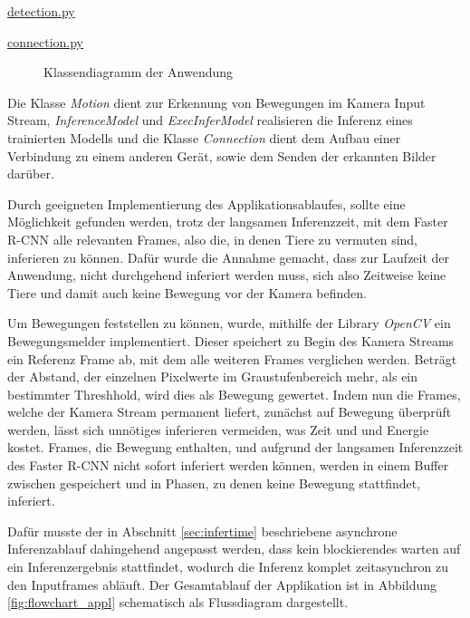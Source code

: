 \vspace{1cm}
\begin{minipage}{0.75\textwidth}
    \centering
    \underline{detection.py}
\end{minipage}
\begin{minipage}{0.25\textwidth}
    \centering
    \underline{connection.py}
\end{minipage}
\begin{figure}[H]
    \centering
        
    \caption{Klassendiagramm der Anwendung}
    \label{fig:class_diagram}
\end{figure}
\vspace{1cm}


Die Klasse \textit{Motion} dient zur Erkennung von Bewegungen 
im Kamera Input Stream, \textit{InferenceModel} und
\textit{ExecInferModel} realisieren die Inferenz 
eines trainierten Modells und die Klasse 
\textit{Connection} dient dem Aufbau einer
Verbindung zu einem anderen Gerät, sowie dem Senden
der erkannten Bilder darüber.


Durch geeigneten Implementierung des Applikationsablaufes,
sollte eine Möglichkeit gefunden werden, trotz 
der langsamen Inferenzzeit, mit dem Faster R-CNN
alle relevanten Frames, also die, in denen Tiere zu vermuten
sind, inferieren zu können.
Dafür wurde die Annahme gemacht, dass zur Laufzeit der 
Anwendung, nicht durchgehend inferiert werden muss,
sich also Zeitweise keine Tiere und damit auch keine 
Bewegung vor der Kamera befinden.

Um Bewegungen feststellen zu können, 
wurde, mithilfe der Library \textit{OpenCV}
ein Bewegungsmelder implementiert.
Dieser speichert zu Begin des Kamera Streams ein Referenz
Frame ab, mit dem alle weiteren Frames verglichen werden.
Beträgt der Abstand, der einzelnen Pixelwerte im 
Graustufenbereich mehr, als ein bestimmter 
Threshhold, wird dies als Bewegung gewertet.
Indem nun die Frames, welche der Kamera Stream permanent 
liefert, zunächst auf Bewegung überprüft werden, 
lässt sich unnötiges inferieren vermeiden,
was Zeit und und Energie kostet.
Frames, die Bewegung enthalten, und aufgrund der langsamen 
Inferenzzeit des Faster R-CNN nicht sofort inferiert 
werden können, werden in einem Buffer zwischen 
gespeichert und in Phasen, zu denen keine Bewegung stattfindet, 
inferiert.

Dafür musste der in Abschnitt \ref{sec:infertime} beschriebene
asynchrone Inferenzablauf dahingehend angepasst werden,
dass kein blockierendes warten auf 
ein Inferenzergebnis stattfindet,
wodurch die Inferenz komplet zeitasynchron zu 
den Inputframes abläuft.
Der Gesamtablauf der Applikation ist in Abbildung 
\ref{fig:flowchart_appl} 
schematisch als Flussdiagram dargestellt.

